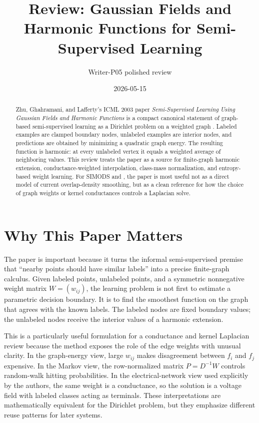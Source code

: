 \documentclass[11pt]{article}
\title{Review: Gaussian Fields and Harmonic Functions for Semi-Supervised Learning}
\author{Writer-P05 polished review}
\date{2026-05-15}
\begin{document}
\maketitle

\begin{abstract}
Zhu, Ghahramani, and Lafferty's ICML 2003 paper
\emph{Semi-Supervised Learning Using Gaussian Fields and Harmonic Functions}
is a compact canonical statement of graph-based semi-supervised learning as a
Dirichlet problem on a weighted graph \citep{zhu2003semisupervised}. Labeled
examples are clamped boundary nodes, unlabeled examples are interior nodes, and
predictions are obtained by minimizing a quadratic graph energy. The resulting
function is harmonic: at every unlabeled vertex it equals a weighted average of
neighboring values. This review treats the paper as a source for finite-graph
harmonic extension, conductance-weighted interpolation, class-mass
normalization, and entropy-based weight learning. For SIMODS and ,
the paper is most useful not as a direct model of current overlap-density
smoothing, but as a clean reference for how the choice of graph weights or
kernel conductances controls a Laplacian solve.
\end{abstract}

\section{Why This Paper Matters}

The paper is important because it turns the informal semi-supervised premise
that ``nearby points should have similar labels'' into a precise finite-graph
calculus. Given labeled points, unlabeled points, and a symmetric nonnegative
weight matrix \(W=(w_{ij})\), the learning problem is not first to estimate a
parametric decision boundary. It is to find the smoothest function on the graph
that agrees with the known labels. The labeled nodes are fixed boundary values;
the unlabeled nodes receive the interior values of a harmonic extension.

This is a particularly useful formulation for a conductance and kernel
Laplacian review because the method exposes the role of the edge weights with
unusual clarity. In the graph-energy view, large \(w_{ij}\) makes disagreement
between \(f_i\) and \(f_j\) expensive. In the Markov view, the row-normalized
matrix \(P=D^{-1}W\) controls random-walk hitting probabilities. In the
electrical-network view used explicitly by the authors, the same weight is a
conductance, so the solution is a voltage field with labeled classes acting as
terminals. These interpretations are mathematically equivalent for the
Dirichlet problem, but they emphasize different reuse patterns for later
systems.
\end{document}
